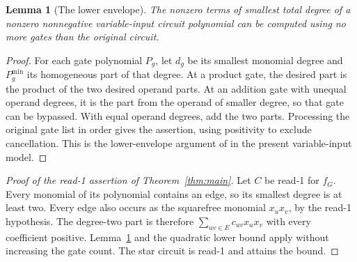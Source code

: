 \documentclass[11pt]{article}
\newtheorem{lemma}[theorem]{Lemma}
\theoremstyle{definition}
\theoremstyle{remark}
\begin{document}
\begin{lemma}[The lower envelope]\label{lem:lowerenvelope}
The nonzero terms of smallest total degree of a nonzero nonnegative variable-input circuit polynomial can be computed using no more gates than the original circuit.
\end{lemma}
\begin{proof}
For each gate polynomial $P_g$, let $d_g$ be its smallest monomial degree and $P_g^{\min}$ its homogeneous part of that degree. At a product gate, the desired part is the product of the two desired operand parts. At an addition gate with unequal operand degrees, it is the part from the operand of smaller degree, so that gate can be bypassed. With equal operand degrees, add the two parts. Processing the original gate list in order gives the assertion, using positivity to exclude cancellation. This is the lower-envelope argument of \citet[Lemma~2, p.~7]{JuknaRead} in the present variable-input model.
\end{proof}

\begin{proof}[Proof of the read-1 assertion of Theorem~\ref{thm:main}]
Let $C$ be read-1 for $f_G$. Every monomial of its polynomial contains an edge, so its smallest degree is at least two. Every edge also occurs as the squarefree monomial $x_ux_v$, by the read-1 hypothesis. The degree-two part is therefore $\sum_{uv\in E}c_{uv}x_ux_v$ with every coefficient positive. Lemma~\ref{lem:lowerenvelope} and the quadratic lower bound apply without increasing the gate count. The star circuit is read-1 and attains the bound.
\end{proof}
\end{document}
